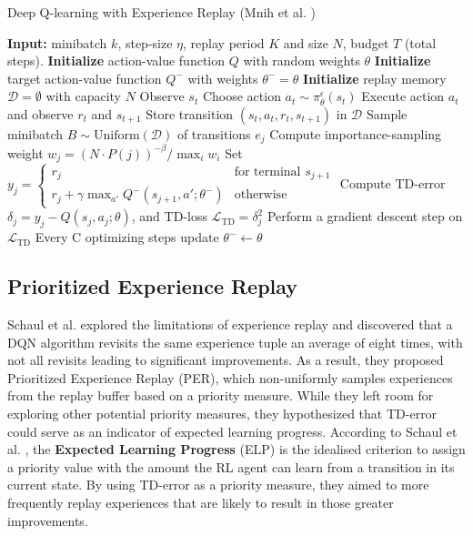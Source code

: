 \begin{algorithm}[h]
\caption{Deep Q-learning with Experience Replay (Mnih et al. \cite{mnih2013playing, mnih2015human})}
\label{algorithm:dqn}
\begin{algorithmic}[1]
\State \textbf{Input:} minibatch $k$, step-size $\eta$, replay period $K$ and size $N$, budget $T$ (total steps).
\State \textbf{Initialize} action-value function $Q$ with random weights $\theta$
\State \textbf{Initialize} target action-value function $Q^-$ with weights $\theta^- = \theta$
\State \textbf{Initialize} replay memory $\mathcal{D} = \emptyset$ with capacity $N$ %
    \State Observe $s_t$
    \State Choose action $a_t \sim \pi^\epsilon_\theta(s_t)$
    \State Execute action $a_t$ and observe $r_t$ and $s_{t+1}$
    \State Store transition $(s_t, a_t, r_t, s_{t+1})$ in $\mathcal{D}$
        \State Sample minibatch $B \sim \text{Uniform}(\mathcal{D})$ of transitions $e_j$
        \State Compute importance-sampling weight $w_j = \left( N \cdot P(j) \right)^{-\beta} / \max_i w_i$
        \State Set $y_j = 
        \begin{cases} 
            r_j & \text{for terminal } s_{j+1}\\
            r_j + \gamma \max_{a'} Q^-(s_{j+1}, a'; \theta^-) & \text{otherwise}
        \end{cases}$
        \State Compute TD-error $\delta_j = y_j - Q(s_{j}, a_{j}; \theta)$, and TD-loss $\mathcal{L}_{\text{TD}} = \delta_j^2 $
        \State Perform a gradient descent step on $\mathcal{L}_{\text{TD}}$
        \State Every C optimizing steps update $\theta^- \leftarrow \theta$
\EndFor
\end{algorithmic}
\end{algorithm}

\subsection{Prioritized Experience Replay}
\label{sec:per}
Schaul et al. \cite{schaul2015prioritized} explored the limitations of experience replay and discovered that a DQN algorithm revisits the same experience tuple an average of eight times, with not all revisits leading to significant improvements. As a result, they proposed Prioritized Experience Replay (PER), which non-uniformly samples experiences from the replay buffer based on a priority measure. While they left room for exploring other potential priority measures, they hypothesized that TD-error could serve as an indicator of expected learning progress. According to Schaul et al. \cite{schaul2015prioritized}, the \textbf{Expected Learning Progress} (ELP) is the idealised criterion to assign a priority value with the amount the RL agent can learn from a transition in its current state. By using TD-error as a priority measure, they aimed to more frequently replay experiences that are likely to result in those greater improvements.


